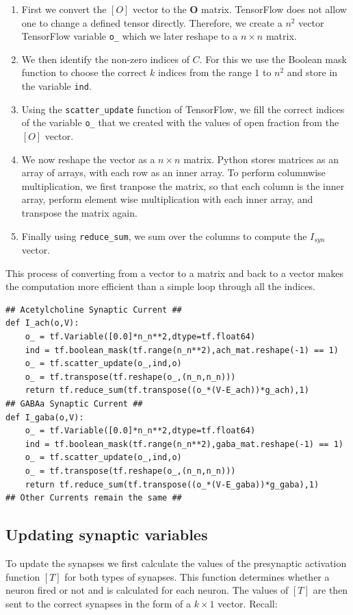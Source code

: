 \documentclass[10pt,letterpaper]{article}
\begin{document}
\begin{nolinenumbers}
\begin{enumerate}
\item First we convert the $[O]$ vector to the $\mathbf{O}$ matrix. TensorFlow does not allow one to change a defined tensor directly. Therefore, we create a $n^{2}$ vector TensorFlow variable \texttt{o\_} which we later reshape to a $n\times n$ matrix.
\item We then identify the non-zero indices of $C$. For this we use the Boolean mask function to choose the correct $k$ indices from the range $1$ to $n^2$ and store in the variable \texttt{ind}.
\item Using the \texttt{scatter\_update} function of TensorFlow, we fill the correct indices of the variable \texttt{o\_} that we created with the values of open fraction from the $[O]$ vector.
\item We now reshape the vector as a $n\times n$ matrix. Python stores matrices as an array of arrays, with each row as an inner array. To perform columnwise multiplication, we first tranpose the matrix, so that each column is the inner array, perform element wise multiplication with each inner array, and transpose the matrix again.
\item Finally using \texttt{reduce\_sum}, we sum over the columns to compute the $I_{syn}$ vector.
\end{enumerate}
This process of converting from a vector to a matrix and back to a vector makes the computation more efficient than a simple loop through all the indices. 
\begin{verbatim}
## Acetylcholine Synaptic Current ##
def I_ach(o,V):
    o_ = tf.Variable([0.0]*n_n**2,dtype=tf.float64)
    ind = tf.boolean_mask(tf.range(n_n**2),ach_mat.reshape(-1) == 1)
    o_ = tf.scatter_update(o_,ind,o)
    o_ = tf.transpose(tf.reshape(o_,(n_n,n_n)))
    return tf.reduce_sum(tf.transpose((o_*(V-E_ach))*g_ach),1)
## GABAa Synaptic Current ##
def I_gaba(o,V):
    o_ = tf.Variable([0.0]*n_n**2,dtype=tf.float64)
    ind = tf.boolean_mask(tf.range(n_n**2),gaba_mat.reshape(-1) == 1)
    o_ = tf.scatter_update(o_,ind,o)
    o_ = tf.transpose(tf.reshape(o_,(n_n,n_n)))
    return tf.reduce_sum(tf.transpose((o_*(V-E_gaba))*g_gaba),1)
## Other Currents remain the same ##
\end{verbatim}

\subsection*{Updating synaptic variables}
To update the synapses we first calculate the values of the presynaptic activation function $[T]$ for both types of synapses. This function determines whether a neuron fired or not and is calculated for each neuron. The values of $[T]$ are then sent to the correct synapses in the form of a $k\times 1$ vector. Recall:


\end{nolinenumbers}
\end{document}
